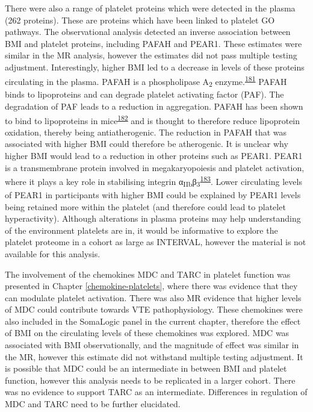 \documentclass[11pt,twoside]{bristolthesis}
\begin{document}
There were also a range of platelet proteins which were detected in the plasma (262 proteins). These are proteins which have been linked to platelet GO pathways. The observational analysis detected an inverse association between BMI and platelet proteins, including PAFAH and PEAR1. These estimates were similar in the MR analysis, however the estimates did not pass multiple testing adjustment. Interestingly, higher BMI led to a decrease in levels of these proteins circulating in the plasma. PAFAH is a phospholipase A\textsubscript{2} enzyme.\textsuperscript{\protect\hyperlink{ref-Marathe2018}{181}} PAFAH binds to lipoproteins and can degrade platelet activating factor (PAF). The degradation of PAF leads to a reduction in aggregation. PAFAH has been shown to bind to lipoproteins in mice\textsuperscript{\protect\hyperlink{ref-Noto2003}{182}} and is thought to therefore reduce lipoprotein oxidation, thereby being antiatherogenic. The reduction in PAFAH that was associated with higher BMI could therefore be atherogenic. It is unclear why higher BMI would lead to a reduction in other proteins such as PEAR1. PEAR1 is a transmembrane protein involved in megakaryopoiesis and platelet activation, where it plays a key role in stabilising integrin α\textsubscript{IIb}β\textsubscript{3}\textsuperscript{\protect\hyperlink{ref-Kauskot2012}{183}}. Lower circulating levels of PEAR1 in participants with higher BMI could be explained by PEAR1 levels being retained more within the platelet (and therefore could lead to platelet hyperactivity). Although alterations in plasma proteins may help understanding of the environment platelets are in, it would be informative to explore the platelet proteome in a cohort as large as INTERVAL, however the material is not available for this analysis.

The involvement of the chemokines MDC and TARC in platelet function was presented in Chapter \ref{chemokine-platelets}, where there was evidence that they can modulate platelet activation. There was also MR evidence that higher levels of MDC could contribute towards VTE pathophysiology. These chemokines were also included in the SomaLogic panel in the current chapter, therefore the effect of BMI on the circulating levels of these chemokines was explored. MDC was associated with BMI observationally, and the magnitude of effect was similar in the MR, however this estimate did not withstand multiple testing adjustment. It is possible that MDC could be an intermediate in between BMI and platelet function, however this analysis needs to be replicated in a larger cohort. There was no evidence to support TARC as an intermediate. Differences in regulation of MDC and TARC need to be further elucidated.
\end{document}
